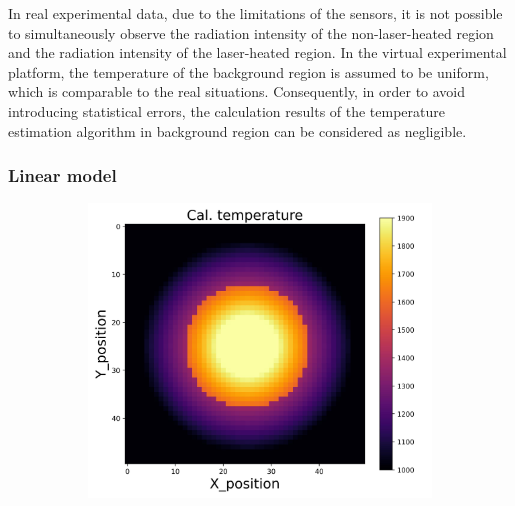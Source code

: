 In real experimental data, due to the limitations of the sensors, it is not 
possible to simultaneously observe the radiation intensity of the non-laser-heated 
region and the radiation intensity of the laser-heated region. In the 
virtual experimental platform, the temperature of the background region is 
assumed to be uniform, which is comparable to the real situations. 
Consequently, in order to avoid introducing statistical errors, the calculation 
results of the temperature estimation algorithm in background region can be 
considered as negligible.

\subsubsection{Linear model}

\begin{figure}[htbp]
    \centering
    \begin{minipage}{\textwidth}
        \centering
        \begin{subfigure}{0.325\textwidth}
            \centering
            \includegraphics[width=\textwidth]{figures/raw_data/21/linear/T_cal.jpg}
        \end{subfigure}
        \begin{subfigure}{0.325\textwidth}
            \centering

\end{subfigure}
\end{minipage}
\end{figure}
